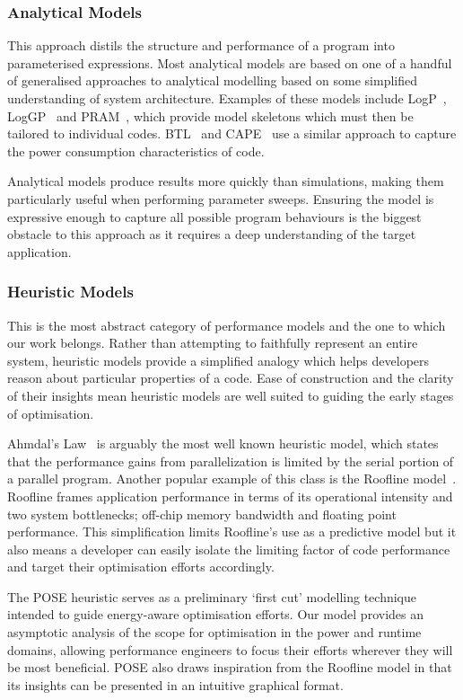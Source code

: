\subsubsection{Analytical Models} This approach distils the structure and performance of a program into parameterised expressions.
Most analytical models are based on one of a handful of generalised approaches to analytical modelling based on some simplified understanding of system architecture.
Examples of these models include LogP~\cite{culler:1993aa}, LogGP~\cite{alexandrov:1997aa} and PRAM~\cite{karp:1991aa}, which provide model skeletons which must then be tailored to individual codes.
BTL~\cite{manousakis:2012aa} and CAPE~\cite{kamble:1997aa} use a similar approach to capture the power consumption characteristics of code. 

Analytical models produce results more quickly than simulations, making them particularly useful when performing parameter sweeps.
Ensuring the model is expressive enough to capture all possible program behaviours is the biggest obstacle to this approach as it requires a deep understanding of the target application.

\subsubsection{Heuristic Models}
This is the most abstract category of performance models and the one to which our work belongs.
Rather than attempting to faithfully represent an entire system, heuristic models provide a simplified analogy which helps developers reason about particular properties of a code.
Ease of construction and the clarity of their insights mean heuristic models are well suited to guiding the early stages of optimisation.

Ahmdal's Law~\cite{amdahl:1967aa} is arguably the most well known heuristic model, which states that the performance gains from parallelization is limited by the serial portion of a parallel program.
Another popular example of this class is the Roofline model~\cite{williams:2009aa}.
Roofline frames application performance in terms of its operational intensity and two system bottlenecks; off-chip memory bandwidth and floating point performance.
This simplification limits Roofline's use as a predictive model but it also means a developer can easily isolate the limiting factor of code performance and target their optimisation efforts accordingly.

The POSE heuristic serves as a preliminary `first cut' modelling technique intended to guide energy-aware optimisation efforts.
Our model provides an asymptotic analysis of the scope for optimisation in the power and runtime domains, allowing performance engineers to focus their efforts wherever they will be most beneficial.
POSE also draws inspiration from the Roofline model in that its insights can be presented in an intuitive graphical format.
